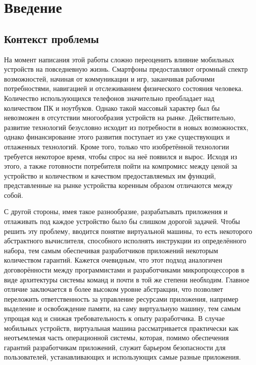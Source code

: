 \chapter{Введение}
\label{sec:Chapter0} 

\section{Контекст проблемы}
На момент написания этой работы сложно переоценить влияние мобильных устройств на повседневную жизнь.
Смартфоны предоставляют огромный спектр возможностей, начиная от коммуникации и игр, заканчивая рабочими потребностями, навигацией и отслеживанием физического состояния человека.
Количество использующихся телефонов значительно преобладает над количеством ПК и ноутбуков.
Однако такой массовый характер был бы невозможен в отсутствии многообразия устройств на рынке.
Действительно, развитие технологий безусловно исходит из потребности в новых возможностях, однако финансирование этого развития поступает из уже существующих и отлаженных технологий.
Кроме того, только что изобретённой технологии требуется некоторое время, чтобы спрос на неё появился и вырос.
Исходя из этого, а также готовности потребителя пойти на компромисс между ценой за устройство и количеством и качеством предоставляемых им функций, представленные на рынке устройства коренным образом отличаются между собой.

\par
С другой стороны, имея такое разнообразие, разрабатывать приложения и отлаживать под каждое устройство было бы слишком дорогой задачей.
Чтобы решить эту проблему, вводится понятие виртуальной машины, то есть некоторого абстрактного вычислителя, способного исполнять инструкции из определённого набора, тем самым обеспечивая разработчиков приложений некоторым количеством гарантий.
Кажется очевидным, что этот подход аналогичен договорённости между программистами и разработчиками микропроцессоров в виде архитектуры системы команд и почти в той же степени необходим.
Главное отличие заключается в более высоком уровне абстракции, что позволяет переложить ответственность за управление ресурсами приложения, например выделение и освобождение памяти, на саму виртуальную машину, тем самым упрощая код и снижая требовательность к опыту разработчика.
В случае мобильных устройств, виртуальная машина рассматривается практически как неотъемлемая часть операционной системы, которая, помимо обеспечения гарантий разработчикам приложений, служит барьером безопасности для пользователей, устанавливающих и использующих самые разные приложения. 

